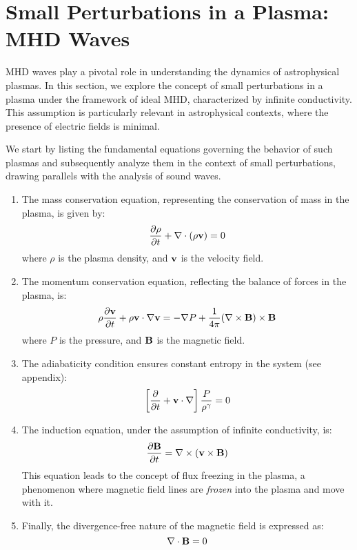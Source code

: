 \section{Small Perturbations in a Plasma: MHD Waves}

MHD waves play a pivotal role in understanding the dynamics of astrophysical plasmas. In this section, we explore the concept of small perturbations in a plasma under the framework of ideal MHD, characterized by infinite conductivity. This assumption is particularly relevant in astrophysical contexts, where the presence of electric fields is minimal.

We start by listing the fundamental equations governing the behavior of such plasmas and subsequently analyze them in the context of small perturbations, drawing parallels with the analysis of sound waves.

\begin{enumerate}
\item The mass conservation equation, representing the conservation of mass in the plasma, is given by:
%
\begin{equation}
\frac{\partial \rho}{\partial t} + \nabla \cdot (\rho \vb{v})=0
\end{equation}
where \(\rho\) is the plasma density, and \(\vb{v}\) is the velocity field.

\item The momentum conservation equation, reflecting the balance of forces in the plasma, is:
%
\begin{equation}
\rho \frac{\partial \vb{v}}{\partial t} + \rho \vb{v} \cdot \nabla \vb{v} = - \nabla P + \frac{1}{4\pi} (\nabla \times \vb{B}) \times \vb{B}
\end{equation}
%
where \(P\) is the pressure, and \(\vb{B}\) is the magnetic field.

\item The adiabaticity condition ensures constant entropy in the system (see appendix):
%
\begin{equation}\label{eq:adiabatic}
\left[ \frac{\partial}{\partial t} + \vb{v}\cdot \vb{\nabla} \right] \frac{P}{\rho^\gamma}=0
\end{equation}

\item The induction equation, under the assumption of infinite conductivity, is:
%
\begin{equation}
\frac{\partial \vb{B}}{\partial t}=\nabla \times (\vb{v}\times\vb{B})
\end{equation}
This equation leads to the concept of flux freezing in the plasma, a phenomenon where magnetic field lines are \emph{frozen} into the plasma and move with it.

\item Finally, the divergence-free nature of the magnetic field is expressed as:
\begin{equation}
{\nabla}\cdot\vb{B}=0
\end{equation}
\end{enumerate}

